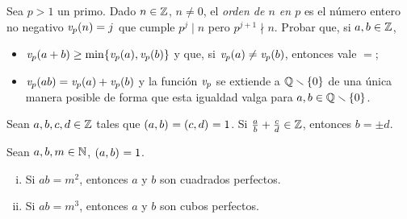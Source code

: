 

\begin{ejerPrimos}\label{ejer:primos:orden}
	Sea $p>1$ un primo. Dado $n\in\Enteros$, $n\neq 0$, el
	\emph{orden de $n$ en $p$} es el n\'umero entero no negativo
	$\valuacion[p](n)=j$ que cumple $p^j\mid n$ pero $p^{j+1}\nmid n$.
	Probar que, si $a,b\in\Enteros$,
	\begin{itemize}
		\item
			\begin{math}
				\valuacion[p](a+b)\geq\min\{
					\valuacion[p](a),\valuacion[p](b)\}
			\end{math}
			y que, si
			\begin{math}
				\valuacion[p](a)\neq \valuacion[p](b)
			\end{math},
			entonces vale $=$;
		\item
			\begin{math}
				\valuacion[p](ab)=\valuacion[p](a)+
					\valuacion[p](b)
			\end{math}
			y la funci\'on $\valuacion[p]$ se extiende a
			$\Racionales\setmin\{0\}$ de una \'unica manera
			posible de forma que esta igualdad valga para
			$a,b\in\Racionales\setmin\{0\}$.
	\end{itemize}
\end{ejerPrimos}

\begin{ejerPrimos}
	Sean $a,b,c,d\in\Enteros$ tales que $\mcd{a,b}=\mcd{c,d}=1$.
	Si $\frac a{b}+\frac c{d}\in\Enteros$, entonces $b=\pm d$.
\end{ejerPrimos}

\begin{ejerPrimos}
	Sean $a,b,m\in\Naturales$, $\mcd{a,b}=1$.
	\begin{enumerate}[(i)]
		\item Si $ab=m^2$, entonces $a$ y $b$ son cuadrados perfectos.
		\item Si $ab=m^3$, entonces $a$ y $b$ son cubos perfectos.
	\end{enumerate}
\end{ejerPrimos}

